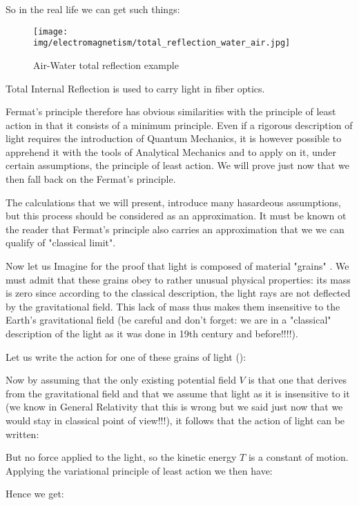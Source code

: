 	So in the real life we can get such things:
	\begin{figure}[H]
		\centering
		\texttt{[image: img/electromagnetism/total\_reflection\_water\_air.jpg]}
		\caption[]{Air-Water total reflection example}
	\end{figure}
	\begin{tcolorbox}[title=Remark,colframe=black,arc=10pt]
	Total Internal Reflection is used to carry light in fiber optics.
	\end{tcolorbox}
	Fermat's principle therefore has obvious similarities with the principle of least action in that it consists of a minimum principle. Even if a rigorous description of light requires the introduction of Quantum Mechanics, it is however possible to apprehend it with the tools of Analytical Mechanics and to apply on it, under certain assumptions, the principle of least action. We will prove just now that we then fall back on the Fermat's principle.

	The calculations that we will present, introduce many hasardeous assumptions, but this process should be considered as an approximation. It must be known ot the reader that Fermat's principle also carries an approximation that we we can qualify of "classical limit".
	
	Now let us Imagine for the proof that light is composed of material "grains" . We must admit that these grains obey to rather unusual physical properties: its mass is zero since according to the classical description, the light rays are not deflected by the gravitational field. This lack of mass thus makes them insensitive to the Earth's gravitational field (be careful and don't forget: we are in a "classical" description of the light as it was done in 19th century and before!!!!).

	Let us write the action for one of these grains of light ():
	
	Now by assuming that the only existing potential field $V$ is that one that derives from the gravitational field and that we assume that light as it is insensitive to it (we know in General Relativity that this is wrong but we said just now that we would stay in classical point of view!!!), it follows that the action of light can be written:
	
	But no force applied to the light, so the kinetic energy $T$ is a constant of motion. Applying  the variational principle of least action we then have:
	
	Hence we get:
	
